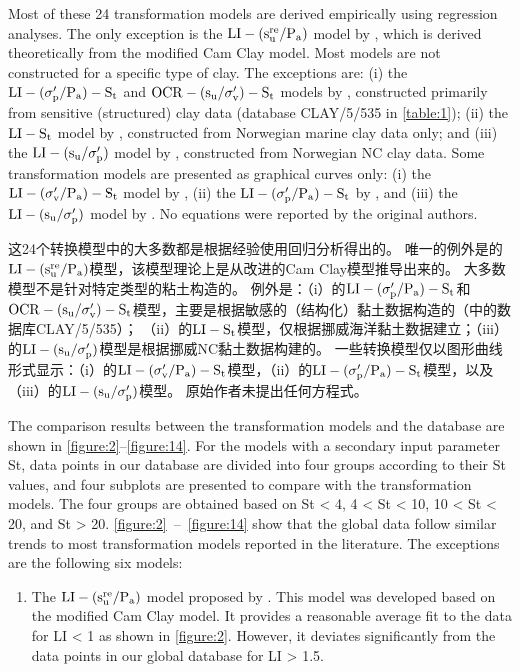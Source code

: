 \begin{paracol}{2}
    Most of these 24 transformation models are derived empirically using regression analyses. The only exception is the $\rm{LI}-(s_u^{re}/P_a)$ model by \citet{Wroth1978137}, which is derived  theoretically from the modified Cam Clay model. Most models are not constructed for a specific type of clay. The exceptions are: (i) the $\rm{LI}-(\sigma_p'/P_a)-S_t$ and $\rm{OCR}-(s_u/\sigma_v')-S_t$ models by \citet{Ching2012522}, constructed primarily from sensitive (structured) clay data (database CLAY/5/535 in \autoref{table:1}); (ii) the $\rm{LI}-S_t$ model by \citet{Bjerrum195449}, constructed from Norwegian marine clay data only; and (iii) the $\rm{LI}-(s_u/\sigma_p')$ model by \citet{Bjerrum1960711}, constructed from Norwegian NC clay data. Some transformation models are presented as graphical curves only: (i) the $\rm{LI}-(\sigma_v'/P_a)-S_t$ model by \citet{Mitchell1993}, (ii) the $\rm{LI}-(\sigma_p'/P_a)-S_t$ by \citet{NAVFAC1982}, and (iii) the $\rm{LI}-(s_u/\sigma_p')$ model by \citet{Bjerrum1960711}. No equations were reported by the original authors.
    
    \switchcolumn
        
    这24个转换模型中的大多数都是根据经验使用回归分析得出的。 唯一的例外是\citet{Wroth1978137}的$\rm{LI}-(s_u^{re}/P_a)$模型，该模型理论上是从改进的Cam Clay模型推导出来的。 大多数模型不是针对特定类型的粘土构造的。 例外是：（i）\citet{Ching2012522}的$\rm{LI}-(\sigma_p'/P_a)-S_t$和$\rm{OCR}-(s_u/\sigma_v')-S_t$模型，主要是根据敏感的（结构化）黏土数据构造的（中的数据库CLAY/5/535）； （ii）\citet{Bjerrum195449}的$\rm{LI}-S_t$模型，仅根据挪威海洋黏土数据建立；（iii）\citet{Bjerrum1960711}的$\rm{LI}-(s_u/\sigma_p')$模型是根据挪威NC黏土数据构建的。 一些转换模型仅以图形曲线形式显示：（i）\citet{Mitchell1993}的$\rm{LI}-(\sigma_v'/P_a)-S_t$模型，（ii）\citet{NAVFAC1982}的$\rm{LI}-(\sigma_p'/P_a)-S_t$模型，以及（iii）\citet{Bjerrum1960711}的$\rm{LI}-(s_u/\sigma_p')$模型。 原始作者未提出任何方程式。
    
    
    \switchcolumn*
        
    The comparison results between the transformation models and the database are shown in \autoref{figure:2}–\autoref{figure:14}. For the models with a secondary input parameter St, data points in our database are divided into four groups according to their St values, and four subplots are presented to compare with the transformation models. The four groups are obtained based on St < 4, 4 < St < 10, 10 < St < 20, and St > 20. \autoref{figure:2}~–~\autoref{figure:14} show that the global data follow similar trends to most transformation models reported in the literature. The exceptions are the following six models:
    \begin{enumerate}
        \item The $\rm{LI}-(s_u^{re}/P_a)$ model proposed by \citet{Wroth1978137}. This model was developed based on the modified Cam Clay model. It provides a reasonable average fit to the data for LI < 1 as shown in \autoref{figure:2}. However, it deviates significantly from the data points in our global database for LI > 1.5.
        

\end{enumerate}
\end{paracol}
